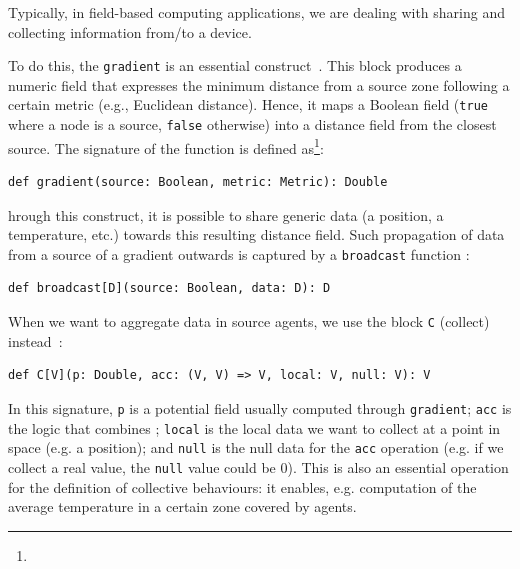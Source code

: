 Typically, in field-based computing applications, we are dealing with sharing and collecting information from/to a device.

To do this, the \lstinline|gradient| is an essential construct~\cite{DBLP:conf/saso/AudritoCDV17}.
%
This block produces a numeric field that expresses the minimum distance from a source zone following a certain metric (e.g., Euclidean distance).
%
Hence, it maps a Boolean field (\lstinline|true| where a node is a source, \lstinline|false| otherwise) into a distance field from the closest source. The signature of the function is defined as\footnote{}:
%
\begin{lstlisting}
def gradient(source: Boolean, metric: Metric): Double
\end{lstlisting}
%
%
%
hrough this construct, it is possible to share generic data (a position, a temperature, etc.) towards this resulting distance field.
%
Such propagation of data from a source of a gradient outwards
 is captured by a
\lstinline|broadcast| function :
\begin{lstlisting}
def broadcast[D](source: Boolean, data: D): D
\end{lstlisting}
%
When we want to aggregate data in source agents, we use the block \lstinline|C| (collect) instead~\cite{audrito2021jcee-distributed-collection}:
\begin{lstlisting}
def C[V](p: Double, acc: (V, V) => V, local: V, null: V): V
\end{lstlisting}
%
In this signature, \lstinline|p| is a potential field usually computed through \lstinline|gradient|; \lstinline|acc| is the logic that combines ; \lstinline|local| is the local data we want to collect at a point in space (e.g. a position); and \lstinline|null| is the null data for the \lstinline|acc| operation (e.g. if we collect a real value, the \lstinline|null| value could be 0).
%
This is also an essential operation for the definition of collective behaviours: it enables, e.g. computation of the average temperature in a certain zone covered by agents.

